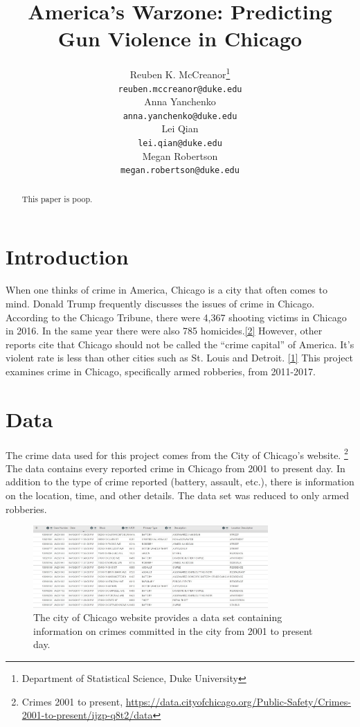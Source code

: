 \documentclass{article} %
\title{America's Warzone: Predicting Gun Violence in Chicago}
\author{
Reuben K. McCreanor\thanks{Department of Statistical Science, Duke University} \\  
\texttt{reuben.mccreanor@duke.edu} \\
\And
Anna Yanchenko\footnotemark[1] \\
\texttt{anna.yanchenko@duke.edu} \\
\And 
Lei Qian\footnotemark[1] \\
\texttt{lei.qian@duke.edu} \\
\And
Megan Robertson\footnotemark[1] \\
\texttt{megan.robertson@duke.edu} \\ 
}
\begin{document}
\maketitle

\begin{abstract}
This paper is poop. \newline
\end{abstract}

\section{Introduction}
\label{headings}

\noindent When one thinks of crime in America, Chicago is a city that often comes to mind. Donald Trump frequently discusses the issues of crime in Chicago. According to the Chicago Tribune, there were 4,367 shooting victims in Chicago in 2016. In the same year there were also 785 homicides.\hyperlink{Ref2}{[2]} However, other reports cite that Chicago should not be called the “crime capital” of America. It’s violent rate is less than other cities such as St.  Louis and Detroit. \hyperlink{Ref1}{[1]} This project examines crime in Chicago, specifically armed robberies, from 2011-2017. \newline

\section{Data}
\label{headings}

\noindent The crime data used for this project comes from the City of Chicago's website. \footnote{Crimes 2001 to present, \url{https://data.cityofchicago.org/Public-Safety/Crimes-2001-to-present/ijzp-q8t2/data}} The data contains every reported crime in Chicago from 2001 to present day. In addition to the type of crime reported (battery, assault, etc.), there is information on the location, time, and other details. The data set was reduced to only armed robberies. 

\begin{figure}[h]
\begin{center}

\includegraphics[width=0.8\textwidth,keepaspectratio]{data.jpg}
\caption{The city of Chicago website provides a data set containing information on crimes committed in the city from 2001 to present day.}
\label{data}
\end{center}
\end{figure}
\end{document}

